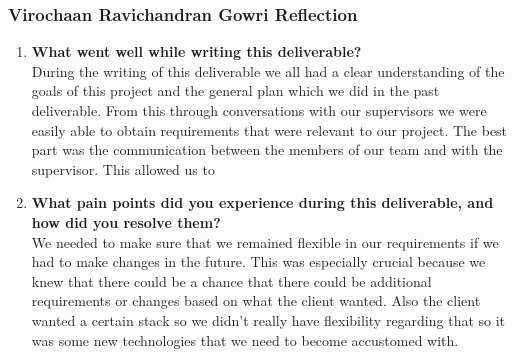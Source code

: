 \subsubsection*{Virochaan Ravichandran Gowri Reflection}
\begin{enumerate}
  \item \textbf{What went well while writing this deliverable?} \\
  During the writing of this deliverable we all had a clear understanding of the goals of this project and the general
  plan which we did in the past deliverable. From this through conversations with our supervisors we were easily able to
  obtain requirements that were relevant to our project. The best part was the communication between the members of our
  team and with the supervisor. This allowed us to
  \item \textbf{What pain points did you experience during this deliverable, and how did you resolve them?} \\
  We needed to make sure that we remained flexible in our requirements if we had to make changes in the future. This was
  especially crucial because we knew that there could be a chance that there could be additional requirements or changes
  based on what the client wanted. Also the client wanted a certain stack so we didn't really have flexibility regarding
  that so it was some new technologies that we need to become accustomed with.
\end{enumerate}


